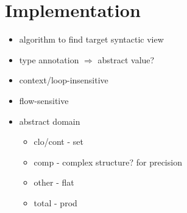 \section{Implementation}\label{sec:impl}

\todo

\begin{itemize}
  \item algorithm to find target syntactic view
  \item type annotation $\Rightarrow$ abstract value?
  \item context/loop-insensitive
  \item flow-sensitive
  \item abstract domain
    \begin{itemize}
      \item clo/cont - set
      \item comp - complex structure? for precision
      \item other - flat
      \item total - prod
    \end{itemize}
\end{itemize}
